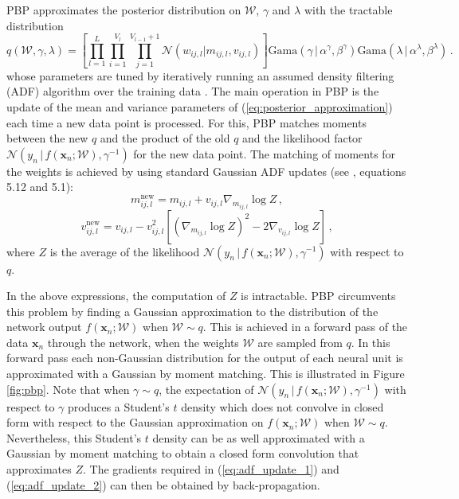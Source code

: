 PBP approximates the posterior distribution on $\mathcal{W}$, $\gamma$ and $\lambda$ with the tractable distribution
\begin{equation}
q(\mathcal{W},\gamma, \lambda) = \left[ \prod_{l=1}^L\! \prod_{i=1}^{V_l}\! 
\prod_{j=1}^{V_{l\!-\!1}\!+\!1} \mathcal{N}(w_{ij,l}| m_{ij,l},v_{ij,l})\right ]
 \text{Gama}(\gamma \,|\, \alpha^\gamma, \beta^\gamma)
\text{Gama}(\lambda \,|\, \alpha^\lambda, \beta^\lambda)\,.\label{eq:posterior_approximation}
\end{equation}
whose parameters are tuned by iteratively running an assumed density filtering (ADF) algorithm over the training data \cite{Opper1998}. The main operation in PBP is the update of the mean and variance parameters of (\ref{eq:posterior_approximation})
each time a new data point is processed. For this, PBP matches moments between the new $q$ and the product of the old $q$ and the likelihood factor $\mathcal{N}(y_n \,|\, f(\mathbf{x}_n;\mathcal{W}),\gamma^{-1})$ for the new data point. The matching of moments for the weights is achieved by using standard Gaussian ADF updates (see \cite{minka2001family}, equations 5.12 and 5.1):
\begin{equation}
\label{eq:adf_update_1} m_{ij,l}^\text{new} =  m_{ij,l} + v_{ij,l} \nabla_{m_{ij,l}} \log Z \,,
\end{equation}
\begin{equation}
\label{eq:adf_update_2}v_{ij,l}^\text{new} = v_{ij,l} - v_{ij,l}^2 \left[ (\nabla_{m_{ij,l}} \log Z)^2 - 2 \nabla_{v_{ij,l}} \log Z \right]\,,
\end{equation}
where $Z$ is the average of the likelihood $\mathcal{N}(y_n\,|\, f(\mathbf{x}_n;\mathcal{W}),\gamma^{-1})$ with respect to $q$. 

In the above expressions, the computation of $Z$ is intractable. PBP circumvents this problem by
finding a Gaussian approximation to the distribution of the network output $f(\mathbf{x}_n;\mathcal{W})$ when $\mathcal{W} \sim q$.
This is achieved in a forward pass of the data $\mathbf{x}_n$ through the network, when the weights $\mathcal{W}$ are sampled from $q$. In this forward pass each non-Gaussian distribution for the output of each neural unit is approximated with a Gaussian by moment matching. This is illustrated in Figure \ref{fig:pbp}. Note that when $\gamma\sim q$, the expectation of $\mathcal{N}(y_n \,|\, f(\mathbf{x}_n;\mathcal{W}),\gamma^{-1})$ with respect to $\gamma$ produces a Student's $t$ density which does not convolve in closed form with respect to the Gaussian approximation on $f(\mathbf{x}_n;\mathcal{W})$ when $\mathcal{W} \sim q$. Nevertheless, this Student's $t$ density can be as well approximated with a Gaussian by moment matching to obtain a closed form convolution that approximates $Z$. The gradients required in (\ref{eq:adf_update_1}) and (\ref{eq:adf_update_2}) can then be obtained by back-propagation. 

